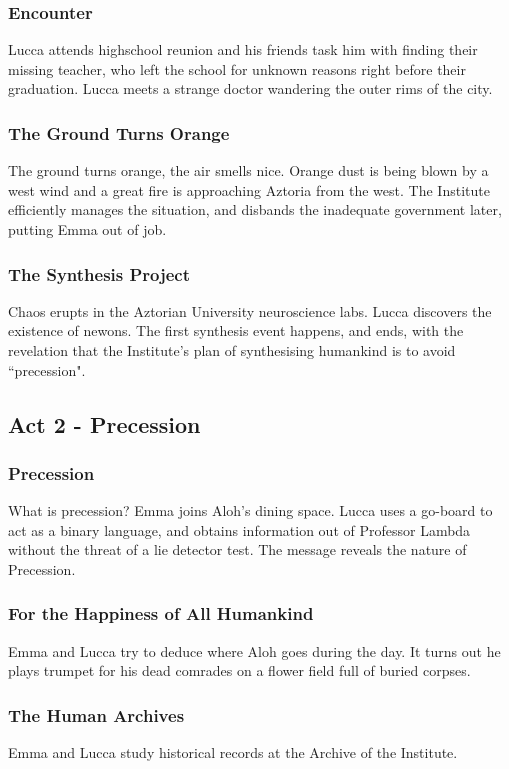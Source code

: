 \documentclass[11pt]{article}
\begin{document}
		\subsubsection{Encounter}
		Lucca attends highschool reunion and his friends task him with finding their missing teacher, who left the school for unknown reasons right before their graduation. 
		Lucca meets a strange doctor wandering the outer rims of the city.
		\subsubsection{The Ground Turns Orange}
		The ground turns orange, the air smells nice.
		Orange dust is being blown by a west wind and a great fire is approaching Aztoria from the west. 
		The Institute efficiently manages the situation, and disbands the inadequate government later, putting Emma out of job.
		\subsubsection{The Synthesis Project}
		Chaos erupts in the Aztorian University neuroscience labs. 
		Lucca discovers the existence of newons.
		The first synthesis event happens, and ends, with the revelation that the Institute's plan of synthesising humankind is to avoid ``precession".
	\newpage



	\subsection{Act 2 - Precession}
		\subsubsection{Precession}
		What is precession? 
		Emma joins Aloh's dining space.
		Lucca uses a go-board to act as a binary language, and obtains information out of Professor Lambda without the threat of a lie detector test.
		The message reveals the nature of Precession.
		\subsubsection{For the Happiness of All Humankind}
		Emma and Lucca try to deduce where Aloh goes during the day.
		It turns out he plays trumpet for his dead comrades on a flower field full of buried corpses.
		\subsubsection{The Human Archives}
		Emma and Lucca study historical records at the Archive of the Institute.
\end{document}
